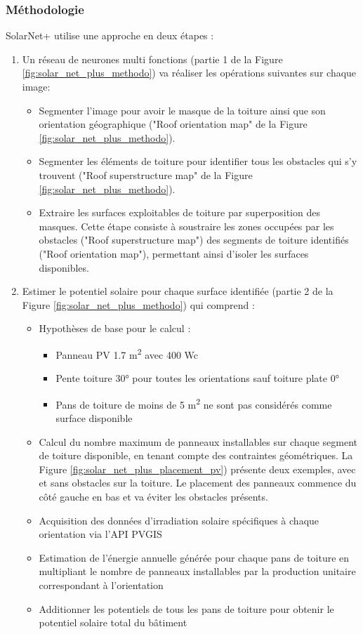 \subsubsection{Méthodologie}
\par{SolarNet+ utilise une approche en deux étapes :}
\begin{enumerate}
    \item Un réseau de neurones multi fonctions (partie 1 de la Figure \ref{fig:solar_net_plus_methodo}) va réaliser les opérations suivantes sur chaque image:
    \begin{itemize}
        \item Segmenter l'image pour avoir le masque de la toiture ainsi que son orientation géographique ("Roof orientation map" de la Figure \ref{fig:solar_net_plus_methodo}).
        \item Segmenter les éléments de toiture pour identifier tous les obstacles qui s'y trouvent ("Roof superstructure map" de la Figure \ref{fig:solar_net_plus_methodo}).
        \item Extraire les surfaces exploitables de toiture par superposition des masques. Cette étape consiste à soustraire les zones occupées par les obstacles ("Roof superstructure map") des segments de toiture identifiés ("Roof orientation map"), permettant ainsi d'isoler les surfaces disponibles.
    \end{itemize}
    \item Estimer le potentiel solaire pour chaque surface identifiée (partie 2 de la Figure \ref{fig:solar_net_plus_methodo}) qui comprend :
    \begin{itemize}
        \item Hypothèses de base pour le calcul :
        \begin{itemize}
            \item Panneau PV 1.7 \si{\unit{\square\meter}} avec 400 Wc
            \item Pente toiture 30° pour toutes les orientations sauf toiture plate 0°
            \item Pans de toiture de moins de 5 \si{\unit{\square\meter}} ne sont pas considérés comme surface disponible
        \end{itemize}
        \item Calcul du nombre maximum de panneaux installables sur chaque segment de toiture disponible, en tenant compte des contraintes géométriques. La Figure \ref{fig:solar_net_plus_placement_pv}) présente deux exemples, avec et sans obstacles sur la toiture. Le placement des panneaux commence du côté gauche en bas et va éviter les obstacles présents.
        \item Acquisition des données d'irradiation solaire spécifiques à chaque orientation via l'API PVGIS
        \item Estimation de l'énergie annuelle générée pour chaque pans de toiture en multipliant le nombre de panneaux installables par la production unitaire correspondant à l'orientation
        \item Additionner les potentiels de tous les pans de toiture pour obtenir le potentiel solaire total du bâtiment
    \end{itemize}
\end{enumerate}

